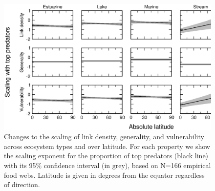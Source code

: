 \documentclass[12pt]{article}
\begin{document}
\begin{figure}[!h]
\centerline{\includegraphics*[width=.8\textwidth]{Figures/by_TL/marginal/T_marginal_latitude_proportions.eps}}
\caption{Changes to the scaling of link density, generality, and vulnerability across ecosystem
types and over latitude. For each property we show the scaling exponent for the proportion of
top predators (black line) with its 95\% confidence interval (in grey), based on N=166 
empirical food webs. Latitude is given in degrees
from the equator regardless of direction.}
\label{T}
\end{figure}


\newpage


\end{document}
